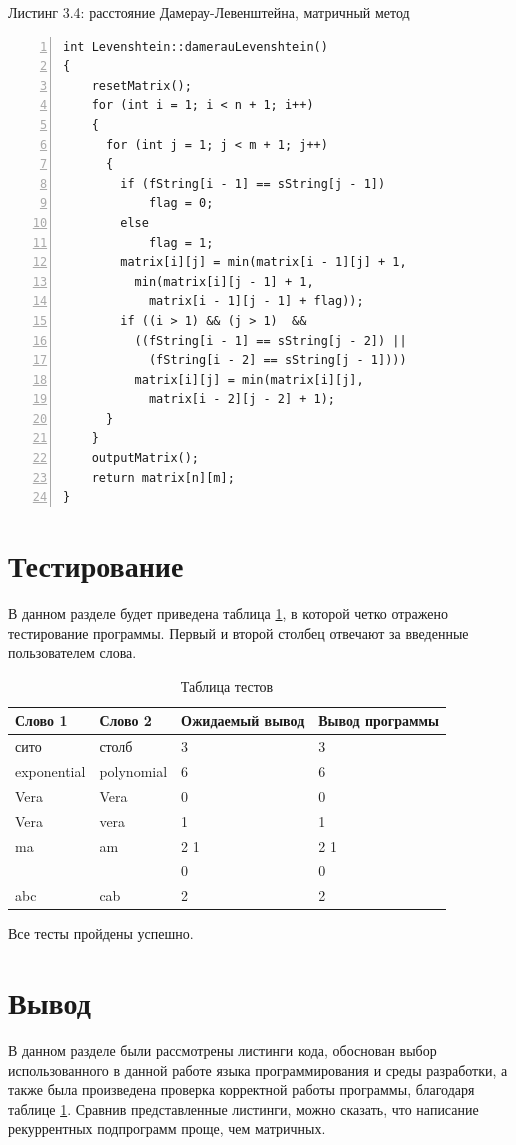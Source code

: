 \documentclass[12pt,a4paper]{report}
\begin{document}
\textrm{Листинг 3.4: расстояние Дамерау-Левенштейна, матричный метод}
\begin{lstlisting}[frame=single, numbers=left]
int Levenshtein::damerauLevenshtein()
{
	resetMatrix();
	for (int i = 1; i < n + 1; i++)
	{
	  for (int j = 1; j < m + 1; j++)
   	  {
		if (fString[i - 1] == sString[j - 1])
			flag = 0;
		else
			flag = 1;
		matrix[i][j] = min(matrix[i - 1][j] + 1, 
		  min(matrix[i][j - 1] + 1, 
			matrix[i - 1][j - 1] + flag));
		if ((i > 1) && (j > 1)  && 
		  ((fString[i - 1] == sString[j - 2]) ||
			(fString[i - 2] == sString[j - 1])))
		  matrix[i][j] = min(matrix[i][j], 
			matrix[i - 2][j - 2] + 1);
	  }
	}
	outputMatrix();
	return matrix[n][m];
}
\end{lstlisting}

\section{Тестирование}

В данном разделе будет приведена таблица \ref{table:ref1}, в которой четко отражено тестирование программы. Первый и второй столбец отвечают за введенные пользователем слова.\\

\begin{table}[ht!]
	\centering
	\caption{Таблица тестов}
	\label{table:ref1}
	\begin{tabular}{ | l | l | l | l |}
		\hline
		Слово 1 & Слово 2 & Ожидаемый вывод &  Вывод программы  \\ \hline
		сито & столб & 3 & 3 \\ \hline
		exponential & polynomial & 6 & 6 \\ \hline
		Vera & Vera & 0 & 0 \\ \hline
		Vera & vera & 1 & 1 \\ \hline
		ma  & am & 2 1 &  2 1 \\ \hline
		& & 0 & 0 \\ \hline
		abc & cab & 2 & 2 \\ \hline
		\hline
	\end{tabular}
\end{table} 


{Все тесты пройдены успешно.}

\section{Вывод}

В данном разделе были рассмотрены листинги кода, обоснован выбор использованного в данной работе языка программирования и среды разработки, а также была произведена проверка корректной работы программы, благодаря таблице \ref{table:ref1}.
Сравнив представленные листинги, можно сказать, что написание рекуррентных подпрограмм проще, чем матричных.
\end{document}
